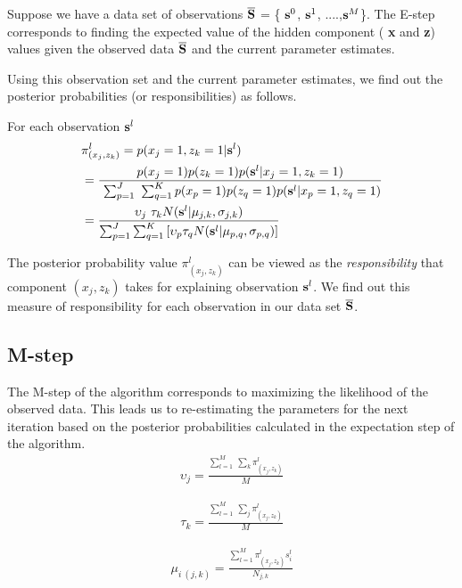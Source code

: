 \documentclass{Localization-PaperWriteupDraft}
\begin{document}
Suppose we have a data set of observations  ${\bf \overline{S}}$ = \{
${\bf {s}}^{0}$, ${\bf {s}}^{1}$, ....,${\bf {s}}^{M}$\}. The E-step
corresponds to finding the expected value of the hidden component ({\bf
		x} and {\bf z}) values given the observed data  ${\bf \overline{S}}$ and the current parameter estimates.

Using this observation set and the current parameter estimates, we find out the posterior probabilities (or responsibilities) as follows. 

For each observation ${\bf {s}}^{l}$
\begin{align}
& \pi_{({x_{j}}, {z_{k}})}^{l}  = p({x_{j}} = 1, {z_{k}} = 1 | {\bf{s}}^{l}) \\ 
& = \frac { p({x_{j}} = 1)p({z_{k}} = 1)p( {\bf {s}}^{l} | {x_{j}} = 1, {z_{k}} = 1)} {\ \sum_{p=1}^J \ \sum_{q=1}^{K} p({x_{p}} = 1) p({z_{q}} = 1) p( {\bf {s}}^{l} | {x_{p}} = 1, {z_{q}} = 1)} \nonumber \\
& = \frac { \upsilon_{j} \ \tau_{k} N({\bf {s}}^{l} | {\bf {\mu}}_{j,k}, {\bf {\sigma}}_{j,k})} {\sum_{p=1}^J \sum_{q=1}^K \left[\upsilon_{p} \tau_{q} N({\bf {s}}^{l} | {\bf {\mu}}_{p,q}, {\bf {\sigma}}_{p,q})\right] }
\end{align}

The posterior probability value $\pi_{({x_{j}}, {z_{k}})}^{l}$ can be viewed as the {\it responsibility} that component $({x_{j}}, {z_{k}})$ takes for explaining observation ${\bf {s}}^{l}$. We find out this measure of responsibility for each observation in our data set ${\bf \overline{S}}$.

\subsection{M-step}
\label{subsec:mstep}

The M-step of the algorithm corresponds to maximizing the likelihood of
the observed data. This leads us to re-estimating the parameters for the next iteration based on the posterior probabilities calculated in the expectation step of the algorithm.
\begin{align}
\upsilon_{j} = \frac { \sum_{l=1}^{M} \ \sum_{k} \pi_{({x_{j}}, {z_{k}})}^{l}} {M}
\end{align}

\begin{align}
\tau_{k} = \frac { \sum_{l=1}^{M} \ \sum_{j} \pi_{({x_{j}}, {z_{k}})}^{l}} {M}
\end{align}

\begin{align}
\mu_{i \ (j,k)} = \frac  { \sum_{l=1}^{M} \pi_{({x_{j}}, {z_{k}})}^{l} s_{i}^{l}} {N_{j,k}}
\end{align}
\end{document}
